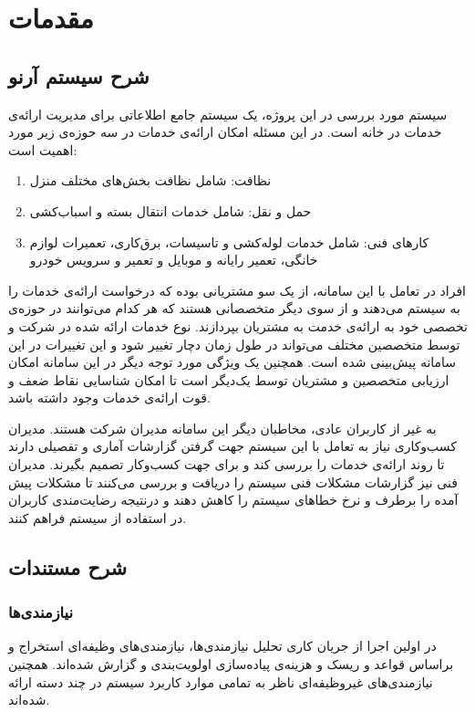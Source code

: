 
\chapter{مقدمات}

\section{شرح سیستم آرنو}

سیستم مورد بررسی در این پروژه، ‌یک سیستم جامع اطلاعاتی برای مدیریت ارائه‌ی خدمات در خانه است. 
در این مسئله امکان ارائه‌ی خدمات در سه حوزه‌ی زیر مورد اهمیت است:

\begin{enumerate}
	\item
	نظافت: شامل نظافت بخش‌های مختلف منزل 
	\item
	حمل و نقل: شامل خدمات انتقال بسته و اسباب‌کشی
	\item 
	کارهای فنی: شامل خدمات لوله‌کشی و تاسیسات، برق‌کاری، تعمیرات لوازم خانگی، تعمیر رایانه و موبایل و تعمیر و سرویس خودرو
	
\end{enumerate}

افراد در تعامل با این سامانه، از یک سو مشتریانی بوده که درخواست ارائه‌ی خدمات را به سیستم می‌دهند و از سوی دیگر متخصصانی هستند که هر کدام می‌توانند در حوزه‌ی تخصصی خود به ارائه‌ی خدمت به مشتریان بپردازند. نوع خدمات ارائه شده در شرکت و توسط متخصصین مختلف می‌تواند در طول زمان دچار تغییر شود و این تغییرات در این سامانه پیش‌بینی شده است. همچنین یک ویژگی مورد توجه دیگر در این سامانه امکان ارزیابی متخصصین و مشتریان توسط یک‌دیگر است تا امکان شناسایی نقاط ضعف و قوت ارائه‌ی خدمات وجود داشته باشد.

به غیر از کاربران عادی، مخاطبان دیگر این سامانه مدیران شرکت هستند. مدیران کسب‌وکاری نیاز به تعامل با این سیستم جهت گرفتن گزارشات آماری و تفصیلی دارند تا روند ارائه‌ی خدمات را بررسی کند و برای جهت کسب‌و‌کار تصمیم بگیرند. مدیران فنی نیز گزارشات مشکلات فنی سیستم را دریافت و بررسی می‌کنند تا مشکلات پیش آمده را برطرف و نرخ خطاهای سیستم را کاهش دهند و درنتیجه رضایت‌مندی کاربران در استفاده از سیستم فراهم کنند.


\section{شرح مستندات}
\subsection{نیازمندی‌ها}
در اولین اجرا از جریان کاری تحلیل نیازمندی‌ها، نیازمندی‌های وظیفه‌ای استخراج و براساس قواعد  و ریسک و هزینه‌ی پیاده‌سازی اولویت‌بندی و گزارش شده‌اند. همچنین نیازمندی‌های غیروظیفه‌ای ناظر به تمامی موارد کاربرد سیستم در چند دسته ارائه شده‌اند.
